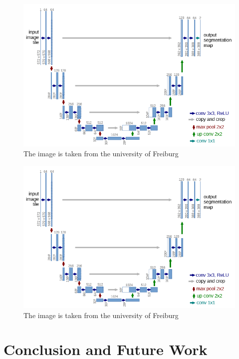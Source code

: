 \documentclass[oneside]{htwg-report}
\begin{document}
\begin{figure}[ht]
    \centering
    \includegraphics[width=0.8\linewidth]{../pics/UNet_Biomedical}
    \caption{The image is taken from the university of Freiburg~\cite{ronneberger2015u}}
\end{figure}



\begin{figure}[ht]
    \centering
    \includegraphics[width=0.8\linewidth]{../pics/UNet_Biomedical}
    \caption{The image is taken from the university of Freiburg~\cite{ronneberger2015u}}
\end{figure}

\section*{Conclusion and Future Work}
\end{document}
